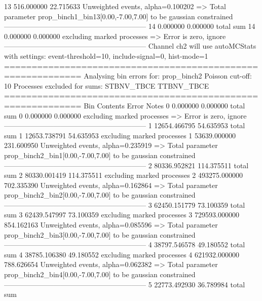 13         516.000000      22.715633       Unweighted events, alpha=0.100202
  => Total parameter prop_binch1_bin13[0.00,-7.00,7.00] to be gaussian constrained
------------------------------------------------------------
14         0.000000        0.000000        total sum                     
14         0.000000        0.000000        excluding marked processes    
  => Error is zero, ignore      
------------------------------------------------------------
Channel ch2 will use autoMCStats with settings: event-threshold=10, include-signal=0, hist-mode=1
============================================================
Analysing bin errors for: prop_binch2
Poisson cut-off: 10
Processes excluded for sums: STBNV_TBCE TTBNV_TBCE
============================================================
Bin        Contents        Error           Notes                         
0          0.000000        0.000000        total sum                     
0          0.000000        0.000000        excluding marked processes    
  => Error is zero, ignore      
------------------------------------------------------------
1          12654.466795    54.635953       total sum                     
1          12653.738791    54.635953       excluding marked processes    
1          53639.000000    231.600950      Unweighted events, alpha=0.235919
  => Total parameter prop_binch2_bin1[0.00,-7.00,7.00] to be gaussian constrained
------------------------------------------------------------
2          80336.952821    114.375511      total sum                     
2          80330.001419    114.375511      excluding marked processes    
2          493275.000000   702.335390      Unweighted events, alpha=0.162864
  => Total parameter prop_binch2_bin2[0.00,-7.00,7.00] to be gaussian constrained
------------------------------------------------------------
3          62450.151779    73.100359       total sum                     
3          62439.547997    73.100359       excluding marked processes    
3          729593.000000   854.162163      Unweighted events, alpha=0.085596
  => Total parameter prop_binch2_bin3[0.00,-7.00,7.00] to be gaussian constrained
------------------------------------------------------------
4          38797.546578    49.180552       total sum                     
4          38785.106380    49.180552       excluding marked processes    
4          621932.000000   788.626654      Unweighted events, alpha=0.062382
  => Total parameter prop_binch2_bin4[0.00,-7.00,7.00] to be gaussian constrained
------------------------------------------------------------
5          22773.492930    36.789984       total sum                     
